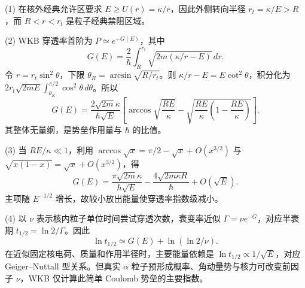 (1) 在核外经典允许区要求 \(E\ge U(r)=\kappa/r\)，因此外侧转向半径 \(r_t=\kappa/E>R\)，而 \(R<r<r_t\) 是粒子经典禁阻区域。

(2) WKB 穿透率首阶为 \(P\simeq e^{-G(E)}\)，其中
\[
G(E)=\frac{2}{\hbar}\int_R^{r_t}\sqrt{2m(\kappa/r-E)}\,dr.
\]
令 \(r=r_t\sin^2\theta\)，下限 \(\theta_R=\arcsin\sqrt{R/r_t}\)。则 \(\kappa/r-E=E\cot^2\theta\)，积分化为 \(2r_t\sqrt{2mE}\int_{\theta_R}^{\pi/2}\cos^2\theta\,d\theta\)。所以
\[
G(E)=\frac{2\sqrt{2m}\kappa}{\hbar\sqrt E}
\left[
\arccos\sqrt{\frac{RE}{\kappa}}-
\sqrt{\frac{RE}{\kappa}\left(1-\frac{RE}{\kappa}\right)}
\right].
\]
其整体无量纲，是势垒作用量与 \(\hbar \) 的比值。

(3) 当 \(RE/\kappa\ll1\)，利用 \(\arccos\sqrt x=\pi/2-\sqrt x+O(x^{3/2})\) 与 \(\sqrt{x(1-x)}=\sqrt x+O(x^{3/2})\)，得
\[
G(E)=\frac{\pi\sqrt{2m}\kappa}{\hbar\sqrt E}
-\frac{4\sqrt{2m\kappa R}}{\hbar}+O(\sqrt E).
\]
主项随 \(E^{-1/2}\) 增长，故较小放出能量使穿透率指数级减小。

(4) 以 \(\nu \) 表示核内粒子单位时间尝试穿透次数，衰变率近似 \(\Gamma=\nu e^{-G}\)，对应半衰期 \(t_{1/2}=\ln2/\Gamma\)。因此
\[
\ln t_{1/2}\simeq G(E)+\ln(\ln2/\nu).
\]
在近似固定核电荷、质量和作用半径时，主要能量依赖是 \(\ln t_{1/2}\propto1/\sqrt E\)，对应 Geiger–Nuttall 型关系。但真实 \(\alpha \) 粒子预形成概率、角动量势与核力可改变前因子 \(\nu \)，WKB 仅计算此简单 Coulomb 势垒的主要指数。
